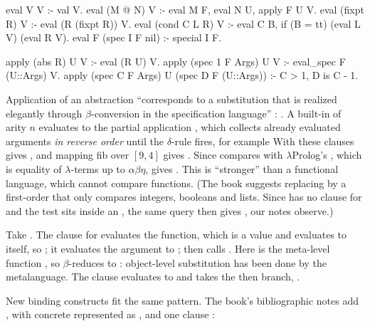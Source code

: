{{\begin{lprolog}
eval V V            :- val V.
eval (M @ N) V      :- eval M F, eval N U, apply F U V.
eval (fixpt R) V    :- eval (R (fixpt R)) V.
eval (cond C L R) V :- eval C B, if (B = tt) (eval L V) (eval R V).
eval F (spec I F nil) :- special I F.

apply (abs R) U V         :- eval (R U) V.
apply (spec 1 F Args) U V :- eval_spec F (U::Args) V.
apply (spec C F Args) U (spec D F (U::Args)) :- C > 1, D is C - 1.
\end{lprolog}

\noindent Application of an abstraction ``corresponds to a substitution that is realized elegantly through
$\beta$-conversion in the specification language'' : . A built-in  of
arity $n$ evaluates to the partial application , which collects already evaluated
arguments \emph{in reverse order} until the $\delta$-rule  fires, for example
 With these clauses
 gives , and mapping fib over $[9,4]$ gives
 . Since  compares with
$\lambda$Prolog's \lp{=}, which is equality of $\lambda$-terms up to $\alpha\beta\eta$,
 gives  . This is ``stronger'' than a
functional language, which cannot compare functions. (The book suggests replacing  by a
first-order  that only compares integers, booleans and lists. Since  has no clause for
 and the test sits inside an , the same query then gives , our notes observe.)

\begin{tutorial}
Take . The clause for  evaluates the function, which
is a value and evaluates to itself, so ; it evaluates the argument
 to ; then  calls . Here  is the
meta-level function , so  $\beta$-reduces to
: object-level substitution has been done by the metalanguage. The 
clause evaluates  to  and takes the then branch, .
\end{tutorial}

\noindent New binding constructs fit the same pattern. The book's bibliographic notes add , with
concrete  represented as , and one clause :

}}
